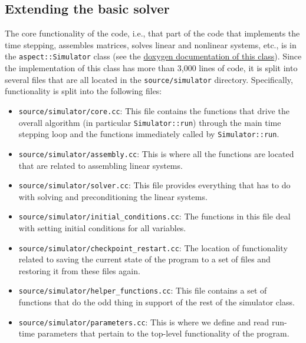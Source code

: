 \documentclass{article}
\begin{document}
\subsection{Extending the basic solver}
\label{sec:extending-solver}

The core functionality of the code, i.e., that part of the code that
implements the time stepping, assembles matrices, solves linear and nonlinear
systems, etc., is in the \texttt{aspect::Simulator} class (see the
\href{doc/doxygen/classaspect_1_1Simulator.html}{doxygen documentation of this
  class}). Since the implementation of this class has more than 3,000 lines of
code, it is split into several files that are all located in the
\texttt{source/simulator} directory. Specifically, functionality is split into
the following files:
\begin{itemize}
\item \texttt{source/simulator/core.cc}: This file contains the functions that
  drive the overall algorithm (in particular \texttt{Simulator::run}) through
  the main time stepping loop and the functions immediately called by
  \texttt{Simulator::run}.
\item \texttt{source/simulator/assembly.cc}: This is where all the functions
  are located that are related to assembling linear systems.
\item \texttt{source/simulator/solver.cc}: This file provides everything that
  has to do with solving and preconditioning the linear systems.
\item \texttt{source/simulator/initial\_conditions.cc}: The functions in this
  file deal with setting initial conditions for all variables.
\item \texttt{source/simulator/checkpoint\_restart.cc}: The location of
  functionality related to saving the current state of the program to a set of
  files and restoring it from these files again.
\item \texttt{source/simulator/helper\_functions.cc}: This file contains a set
  of functions that do the odd thing in support of the rest of the simulator
  class.
\item \texttt{source/simulator/parameters.cc}: This is where we define and
  read run-time parameters that pertain to the top-level functionality of the
  program.
\end{itemize}
\end{document}
